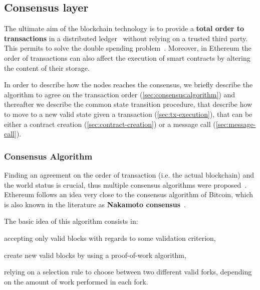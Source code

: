 \subsection{Consensus layer}
\label{sec:consensus}

The ultimate aim of the blockchain technology is to provide a \textbf{total
order to transactions} in a distributed ledger~\cite{bib:the-quest} without
relying on a trusted third party. This permits to solve the double spending
problem~\cite{bib:bitcoin}. Moreover, in Ethereum the order of transactions can
also affect the execution of smart contracts by altering the content of their
storage.

In order to describe how the nodes reaches the consensus, we briefly describe
the algorithm to agree on the transaction order
(\autoref{sec:consensus:algorithm}) and thereafter we describe the common state
transition procedure, that describe how to move to a new valid state given a
transaction (\autoref{sec:tx-execution}), that can be either a contract creation
(\autoref{sec:contract-creation}) or a message call
(\autoref{sec:message-call}).


\subsubsection{Consensus Algorithm}
\label{sec:consensus:algorithm}

Finding an agreement on the order of transaction (i.e. the actual blockchain)
and the world status is crucial, thus multiple consensus algorithms were
proposed~\cite{bib:the-quest}. Ethereum follows an idea very close to the
consensus algorithm of Bitcoin, which is also known in the literature as
\textbf{Nakamoto consensus}~\cite{bib:bitcoin-ng}.

The basic idea of this algorithm consists in:
\begin{enumerate*}[label=(\arabic*)]
    \item accepting only valid blocks with regards to some validation criterion,
    \item create new valid blocks by using a proof-of-work algorithm,
    \item relying on a selection rule to choose between two different
    valid forks, depending on the amount of work performed in each fork.
\end{enumerate*}

